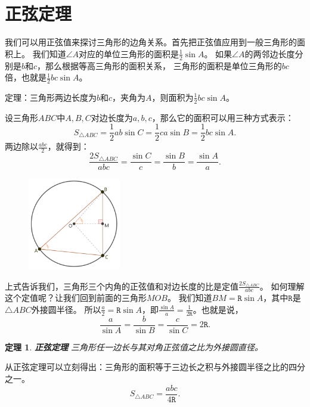 \documentclass[12pt,UTF8]{ctexbook}
\newtheorem{tm}{定理}[section]
\begin{document}
\section{正弦定理}

我们可以用正弦值来探讨三角形的边角关系。首先把正弦值应用到一般三角形的面积上。
我们知道$\angle A$对应的单位三角形的面积是$\frac{1}{2}\sin A$。
如果$\angle A$的两邻边长度分别是$b$和$c$，那么根据等高三角形的面积关系，
三角形的面积是单位三角形的$bc$倍，也就是$\frac{1}{2}bc\sin A$。

定理：三角形两边长度为$b$和$c$，夹角为$A$，则面积为$\frac{1}{2}bc\sin A$。

设三角形$ABC$中$A,B,C$对边长度为$a,b,c$，那么它的面积可以用三种方式表示：
$$ S_{\triangle ABC} = \frac{1}{2}ab\sin C = \frac{1}{2}ca\sin B = \frac{1}{2}bc\sin A.$$
两边除以$\frac{abc}{2}$，就得到：
$$  \frac{2S_{\triangle ABC}}{abc} = \frac{\sin C}{c} = \frac{\sin B}{b} = \frac{\sin A}{a}. $$

\begin{figure} %
    \vspace{-30pt}
    \flushright
    \includegraphics[width=0.36\textwidth]{三角函数1.png}
\end{figure}

上式告诉我们，三角形三个内角的正弦值和对边长度的比是定值$\frac{2S_{\triangle ABC}}{abc}$。
如何理解这个定值呢？让我们回到前面的三角形$MOB$。
我们知道$BM = \mathtt{R}\sin A$，其中$\mathtt{R}$是$\triangle ABC$外接圆半径。
所以$ \frac{a}{2} = \mathtt{R}\sin A$，即$ \frac{\sin A}{a} = \frac{1}{2\mathtt{R}}$。也就是说，
$$ \frac{a}{\sin A} = \frac{b}{\sin B} = \frac{c}{\sin C} =  2\mathtt{R}. $$

\begin{tm}{\textbf{正弦定理} }\label{tm:2-1-10}
    三角形任一边长与其对角正弦值之比为外接圆直径。
\end{tm}
从正弦定理可以立刻得出：三角形的面积等于三边长之积与外接圆半径之比的四分之一。
$$S_{\triangle ABC} = \frac{abc}{4\mathtt{R}}. $$ 
\end{document}
